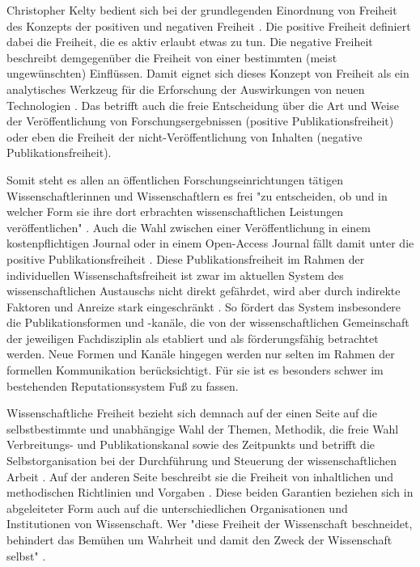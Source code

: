 Christopher Kelty bedient sich bei der grundlegenden Einordnung von Freiheit des Konzepts der positiven und negativen Freiheit \cite{kelty_2014_freedom}. Die positive Freiheit definiert dabei die Freiheit, die es aktiv erlaubt etwas zu tun. Die negative Freiheit beschreibt demgegenüber die Freiheit von einer bestimmten (meist ungewünschten) Einflüssen. Damit eignet sich dieses Konzept von Freiheit als ein analytisches Werkzeug für die Erforschung der Auswirkungen von neuen Technologien \cite{kelty_2014_freedom}. Das betrifft auch die freie Entscheidung über die Art und Weise der Veröffentlichung von Forschungsergebnissen (positive Publikationsfreiheit) \cite{Fangerau_2014} \cite[:190]{Fehling_2014} oder eben die Freiheit der nicht-Veröffentlichung von Inhalten (negative Publikationsfreiheit).

Somit steht es allen an öffentlichen Forschungseinrichtungen tätigen Wissenschaftlerinnen und Wissenschaftlern es frei "zu entscheiden, ob und in welcher Form sie ihre dort erbrachten wissenschaftlichen Leistungen veröffentlichen" \cite{Schmidt_2009}. Auch die Wahl zwischen einer Veröffentlichung in einem kostenpflichtigen Journal oder in einem Open-Access Journal fällt damit unter die positive Publikationsfreiheit \cite[:190]{Fehling_2014}. Diese Publikationsfreiheit
im Rahmen der individuellen Wissenschaftsfreiheit ist zwar im aktuellen System des wissenschaftlichen Austauschs nicht direkt gefährdet, wird aber durch indirekte Faktoren und Anreize stark eingeschränkt \cite{binswanger_2014_excellence}. So fördert das System insbesondere die Publikationsformen und -kanäle, die von der wissenschaftlichen Gemeinschaft der jeweiligen Fachdisziplin als etabliert und als förderungsfähig betrachtet werden. Neue Formen und Kanäle hingegen werden nur selten im Rahmen der formellen Kommunikation berücksichtigt. Für sie ist es besonders schwer im bestehenden Reputationssystem Fuß zu fassen.

Wissenschaftliche Freiheit bezieht sich demnach auf der einen Seite auf die selbstbestimmte und unabhängige Wahl der Themen, Methodik, die freie Wahl Verbreitungs- und Publikationskanal sowie des Zeitpunkts und betrifft die Selbstorganisation bei der Durchführung und Steuerung der wissenschaftlichen Arbeit \cite{Fehling_2014}. Auf der anderen Seite beschreibt sie die Freiheit von inhaltlichen und methodischen Richtlinien und Vorgaben \cite{Goetting_2015}. Diese beiden Garantien beziehen sich in abgeleiteter Form auch auf die unterschiedlichen Organisationen und Institutionen von Wissenschaft. Wer "diese Freiheit der Wissenschaft beschneidet, behindert das Bemühen um Wahrheit und damit den Zweck der Wissenschaft selbst" \cite{Oezmen_2015}.

